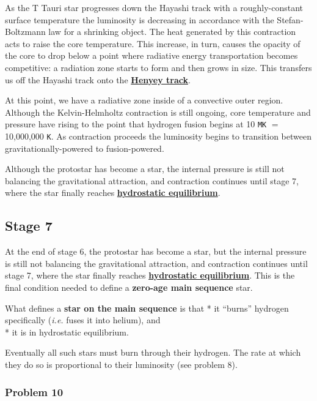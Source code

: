 \documentclass[11pt]{article}
\begin{document}
As the T Tauri star progresses down the Hayashi track with a
roughly-constant surface temperature the luminosity is decreasing in
accordance with the Stefan-Boltzmann law for a shrinking object. The
heat generated by this contraction acts to raise the core temperature.
This increase, in turn, causes the opacity of the core to drop below a
point where radiative energy transportation becomes competitive: a
radiation zone starts to form and then grows in size. This transfers us
off the Hayashi track onto the
\href{https://en.wikipedia.org/wiki/Henyey_track}{\textbf{Henyey
track}}.

At this point, we have a radiative zone inside of a convective outer
region. Although the Kelvin-Helmholtz contraction is still ongoing, core
temperature and pressure have rising to the point that hydrogen fusion
begins at 10 \texttt{MK} \(=\) 10,000,000 \texttt{K}. As contraction
proceeds the luminosity begins to transition between
gravitationally-powered to fusion-powered.

Although the protostar has become a star, the internal pressure is still
not balancing the gravitational attraction, and contraction continues
until stage 7, where the star finally reaches
\href{https://en.wikipedia.org/wiki/Hydrostatic_equilibrium}{\textbf{hydrostatic
equilibrium}}.

\subsection{Stage 7}\label{stage-7}

At the end of stage 6, the protostar has become a star, but the internal
pressure is still not balancing the gravitational attraction, and
contraction continues until stage 7, where the star finally reaches
\href{https://en.wikipedia.org/wiki/Hydrostatic_equilibrium}{\textbf{hydrostatic
equilibrium}}. This is the final condition needed to define a
\textbf{zero-age main sequence} star.

What defines a \textbf{star on the main sequence} is that * it ``burns''
hydrogen specifically (\emph{i.e.} fuses it into helium), and\\
* it is in hydrostatic equilibrium.

Eventually all such stars must burn through their hydrogen. The rate at
which they do so is proportional to their luminosity (see problem 8).

 
\subsubsection{Problem 10}\label{problem-10}
\end{document}
